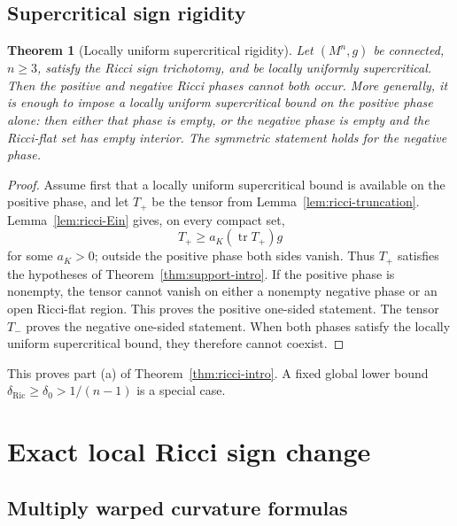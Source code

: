 \documentclass[11pt,reqno]{amsart}
\newtheorem{theorem}{Theorem}[section]
\theoremstyle{definition}
\theoremstyle{remark}
\newcommand{\tr}{\operatorname{tr}}
\newcommand{\dric}{\delta_{\mathrm{Ric}}}
\begin{document}
\subsection{Supercritical sign rigidity}

\begin{theorem}[Locally uniform supercritical rigidity]\label{thm:ricci-rigidity}
Let $(M^n,g)$ be connected, $n\ge3$, satisfy the Ricci sign trichotomy, and be locally uniformly supercritical.  Then the positive and negative Ricci phases cannot both occur.  More generally, it is enough to impose a locally uniform supercritical bound on the positive phase alone: then either that phase is empty, or the negative phase is empty and the Ricci-flat set has empty interior.  The symmetric statement holds for the negative phase.
\end{theorem}

\begin{proof}
Assume first that a locally uniform supercritical bound is available on the positive phase, and let $T_+$ be the tensor from Lemma~\ref{lem:ricci-truncation}.  Lemma~\ref{lem:ricci-Ein} gives, on every compact set,
\[
T_+\ge a_K(\tr T_+)g
\]
for some $a_K>0$; outside the positive phase both sides vanish.  Thus $T_+$ satisfies the hypotheses of Theorem~\ref{thm:support-intro}.  If the positive phase is nonempty, the tensor cannot vanish on either a nonempty negative phase or an open Ricci-flat region.  This proves the positive one-sided statement.  The tensor $T_-$ proves the negative one-sided statement.  When both phases satisfy the locally uniform supercritical bound, they therefore cannot coexist.
\end{proof}

This proves part (a) of Theorem~\ref{thm:ricci-intro}.  A fixed global lower bound $\dric\ge\delta_0>1/(n-1)$ is a special case.

\section{Exact local Ricci sign change}\label{sec:ricci-local}

\subsection{Multiply warped curvature formulas}
\end{document}
